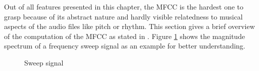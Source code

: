 Out of all features presented in this chapter, the MFCC is the hardest one to grasp because of its abstract nature and hardly visible relatedness to musical aspects of the audio files like pitch or rhythm. This section gives a brief overview of the computation of the MFCC as stated in \cite[pp. 55ff]{knees1}.
Figure \ref{sweep} shows the magnitude spectrum of a frequency sweep signal as an example for better understanding.
\begin{figure}[htbp]
	\centering
	\caption{Sweep signal}	
	\label{sweep}
\end{figure}
